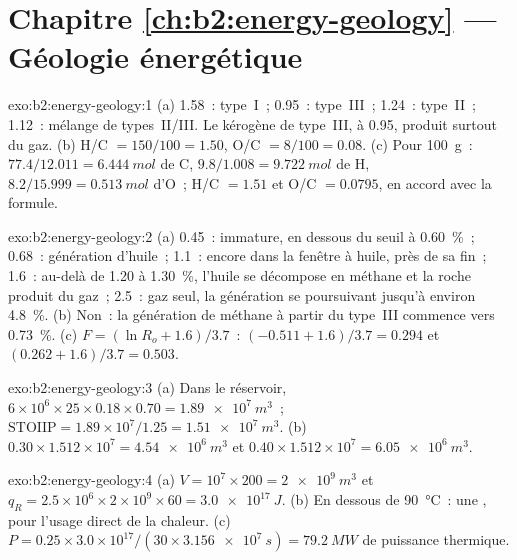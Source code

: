 \section*{Chapitre \ref{ch:b2:energy-geology} --- Géologie énergétique}

\begin{solution}{exo:b2:energy-geology:1}
(a) 1.58~: type~I~; 0.95~: type~III~; 1.24~: type~II~; 1.12~: mélange de types~II/III. Le kérogène de type~III, à
0.95, produit surtout du gaz. (b) H/C $= 150/100 = 1.50$, O/C $= 8/100 = 0.08$. (c) Pour \qty{100}{g}~:
$77.4/12.011 = \qty{6.444}{mol}$ de C, $9.8/1.008 = \qty{9.722}{mol}$ de H, $8.2/15.999 =
\qty{0.513}{mol}$ d'O~; H/C $= 1.51$ et O/C $= 0.0795$, en accord avec la formule.
\end{solution}

\begin{solution}{exo:b2:energy-geology:2}
(a) 0.45~: immature, en dessous du seuil à \qty{0.60}{\percent}~; 0.68~: génération d'huile~; 1.1~: encore dans la fenêtre à huile, près de sa fin~;
1.6~: au-delà de 1.20 à \qty{1.30}{\percent}, l'huile se décompose en méthane et la roche produit du gaz~;
2.5~: gaz seul, la génération se poursuivant jusqu'à environ \qty{4.8}{\percent}. (b) Non~: la génération de méthane à partir du type~III commence vers \qty{0.73}{\percent}.
(c) $F = (\ln R_o + 1.6)/3.7$~: $(-0.511 +
1.6)/3.7 = 0.294$ et $(0.262 + 1.6)/3.7 = 0.503$.
\end{solution}

\begin{solution}{exo:b2:energy-geology:3}
(a) Dans le réservoir, $6 \times 10^6 \times 25 \times 0.18 \times 0.70 = \qty{1.89e7}{m^3}$~;
$\mathrm{STOIIP} = 1.89 \times 10^7/1.25 = \qty{1.51e7}{m^3}$. (b) $0.30 \times 1.512 \times 10^7 =
\qty{4.54e6}{m^3}$ et $0.40 \times 1.512 \times 10^7 = \qty{6.05e6}{m^3}$.
\end{solution}

\begin{solution}{exo:b2:energy-geology:4}
(a) $V = 10^7 \times 200 = \qty{2e9}{m^3}$ et $q_R = 2.5 \times 10^6 \times 2 \times 10^9 \times 60
= \qty{3.0e17}{J}$. (b) En dessous de \qty{90}{\celsius}~: une , pour l'usage direct de la
chaleur. (c) $P = 0.25 \times 3.0 \times 10^{17}/(30 \times \qty{3.156e7}{s}) = \qty{79.2}{MW}$ de puissance thermique.
\end{solution}

